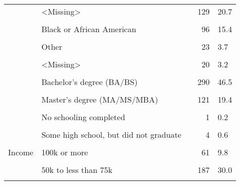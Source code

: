 \documentclass[border=1mm]{standalone}
\begin{document}
\begin{table}[!h]
\begin{tabular}[t]{lllrl}
 & <Missing> &  & 129 & 20.7\\
\addlinespace
\cellcolor{gray!10}{Race} & \cellcolor{gray!10}{Asian} & \cellcolor{gray!10}{} & \cellcolor{gray!10}{5} & \cellcolor{gray!10}{0.8}\\
 & Black or African American &  & 96 & 15.4\\
\cellcolor{gray!10}{} & \cellcolor{gray!10}{Native Hawaiian or Pacific Islander} & \cellcolor{gray!10}{} & \cellcolor{gray!10}{25} & \cellcolor{gray!10}{4.0}\\
 & Other &  & 23 & 3.7\\
\cellcolor{gray!10}{} & \cellcolor{gray!10}{White} & \cellcolor{gray!10}{} & \cellcolor{gray!10}{455} & \cellcolor{gray!10}{72.9}\\
\addlinespace
 & <Missing> &  & 20 & 3.2\\
\cellcolor{gray!10}{Education} & \cellcolor{gray!10}{Associate degree} & \cellcolor{gray!10}{} & \cellcolor{gray!10}{48} & \cellcolor{gray!10}{7.7}\\
 & Bachelor's degree (BA/BS) &  & 290 & 46.5\\
\cellcolor{gray!10}{} & \cellcolor{gray!10}{High school or equivalent (GED)} & \cellcolor{gray!10}{} & \cellcolor{gray!10}{61} & \cellcolor{gray!10}{9.8}\\
 & Master's degree (MA/MS/MBA) &  & 121 & 19.4\\
\addlinespace
\cellcolor{gray!10}{} & \cellcolor{gray!10}{Medical (MD), law (JD) or other doctoral degree (PhD)} & \cellcolor{gray!10}{} & \cellcolor{gray!10}{9} & \cellcolor{gray!10}{1.4}\\
 & No schooling completed &  & 1 & 0.2\\
\cellcolor{gray!10}{} & \cellcolor{gray!10}{Some college, but did not complete a degree} & \cellcolor{gray!10}{} & \cellcolor{gray!10}{87} & \cellcolor{gray!10}{13.9}\\
 & Some high school, but did not graduate &  & 4 & 0.6\\
\cellcolor{gray!10}{} & \cellcolor{gray!10}{<Missing>} & \cellcolor{gray!10}{} & \cellcolor{gray!10}{3} & \cellcolor{gray!10}{\vphantom{1} 0.5}\\
\addlinespace
Income & 100k or more &  & 61 & 9.8\\
\cellcolor{gray!10}{} & \cellcolor{gray!10}{25k to less than 50k} & \cellcolor{gray!10}{} & \cellcolor{gray!10}{191} & \cellcolor{gray!10}{30.6}\\
 & 50k to less than 75k &  & 187 & 30.0\\
\cellcolor{gray!10}{} & \cellcolor{gray!10}{75k to less than 100k} & \cellcolor{gray!10}{} & \cellcolor{gray!10}{95} & \cellcolor{gray!10}{15.2}\\

\end{tabular}
\end{table}
\end{document}
